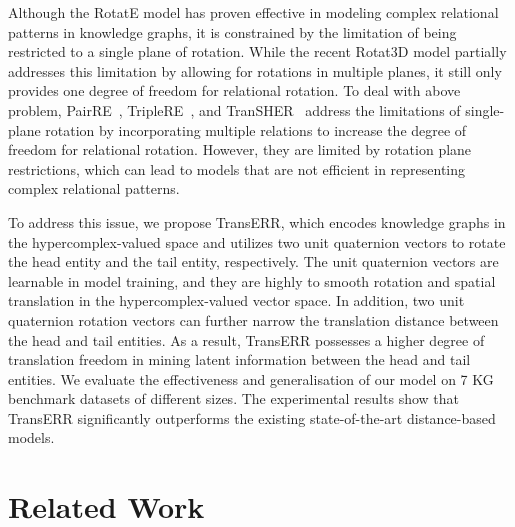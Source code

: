 \documentclass[11pt]{article}
\begin{document}
Although the RotatE model has proven effective in modeling complex relational patterns in knowledge graphs, it is constrained by the limitation of being restricted to a single plane of rotation. While the recent Rotat3D model partially addresses this limitation by allowing for rotations in multiple planes, it still only provides one degree of freedom for relational rotation. To deal with above problem, PairRE~\cite{52chao2020pairre}, TripleRE~\cite{yu2022triplere}, and TranSHER~\cite{li-etal-2022-transher}  address the limitations of single-plane rotation by incorporating multiple relations to increase the degree of freedom for relational rotation. However, they are limited by rotation plane restrictions, which can lead to models that are not efficient in representing complex relational patterns. 





To address this issue, we propose TransERR, which encodes knowledge graphs in the hypercomplex-valued space and utilizes two unit quaternion vectors to rotate the head entity and the tail entity, respectively. The unit quaternion vectors are learnable in model training, and they are highly to smooth rotation and spatial translation in the hypercomplex-valued vector space. In addition, two unit quaternion rotation vectors can further narrow the translation distance between the head and tail entities. As a result, TransERR possesses a higher degree of translation freedom in mining latent information between the head and tail entities. We evaluate the effectiveness and generalisation of our model on 7 KG benchmark datasets of different sizes. The experimental results show that TransERR significantly outperforms the existing state-of-the-art distance-based models.




\section{Related Work}
\end{document}
